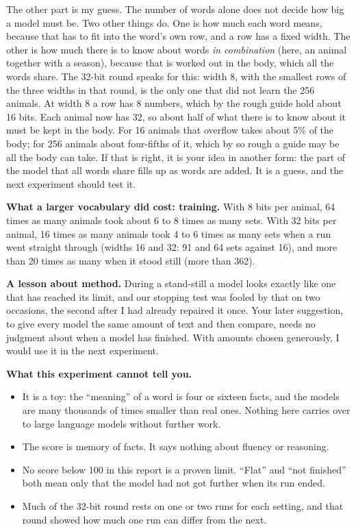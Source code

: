 The other part is my guess. The number of words alone does not decide how big a model must be.
Two other things do. One is how much each word means, because that has to fit into the word's
own row, and a row has a fixed width. The other is how much there is to know about words
\emph{in combination} (here, an animal together with a season), because that is worked out in
the body, which all the words share. The 32-bit round speaks for this: width 8, with the
smallest rows of the three widths in that round, is the only one that did not learn the 256
animals. At width 8 a row has 8 numbers, which by the rough guide hold about 16 bits. Each
animal now has 32, so about half of what there is to know about it must be kept in the body.
For 16 animals that overflow takes about 5\% of the body; for 256 animals about four-fifths of
it, which by so rough a guide may be all the body can take. If that is right,
it is your idea in another form: the part of the model that all words share fills up as words
are added. It is a guess, and the next experiment should test it.

\textbf{What a larger vocabulary did cost: training.} With 8 bits per animal, 64 times as many
animals took about 6 to 8 times as many sets. With 32 bits per animal, 16 times as many animals
took 4 to 6 times as many sets when a run went straight through (widths 16 and 32: 91 and 64
sets against 16), and more than 20 times as many when it stood still (more than 362).

\textbf{A lesson about method.} During a stand-still a model looks exactly like one that has
reached its limit, and our stopping test was fooled by that on two occasions, the second
after I had already repaired it once. Your later suggestion, to give every model the same amount of text
and then compare, needs no judgment about when a model has finished. With amounts chosen
generously, I would use it in the next experiment.

\textbf{What this experiment cannot tell you.}
\begin{itemize}
\item It is a toy: the ``meaning'' of a word is four or sixteen facts, and the models are
      many thousands of times smaller than real ones. Nothing here carries over to large
      language models without further work.
\item The score is memory of facts. It says nothing about fluency or reasoning.
\item No score below 100 in this report is a proven limit. ``Flat'' and ``not finished'' both
      mean only that the model had not got further when its run ended.
\item Much of the 32-bit round rests on one or two runs for each setting, and that round
      showed how much one run can differ from the next.
\end{itemize}
